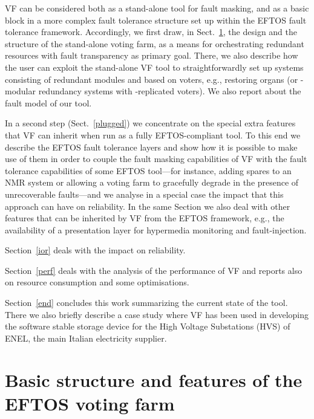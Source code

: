 \documentclass[11pt]{article}
\begin{document}
VF can be considered both as a stand-alone tool for fault masking, and
as a basic block in a more complex fault tolerance structure set up within
the EFTOS fault tolerance framework.  Accordingly, we first draw, in Sect.~\ref{standalone},
the design and the structure of the stand-alone voting farm, as a
means for orchestrating redundant resources with fault transparency as primary goal.
There, we also describe how the user can exploit the stand-alone VF tool to straightforwardly
set up systems consisting of redundant modules and based on voters, e.g.,
restoring organs (or -modular redundancy systems with -replicated voters).
We also report about the fault model of our tool.

In a second step (Sect.~\ref{plugged})
we concentrate on the special extra features that VF
can inherit when run as a fully EFTOS-compliant tool. To this end we 
describe the EFTOS fault tolerance layers and show how it is possible
to make use of them in order to couple the fault masking capabilities
of VF with the fault tolerance capabilities of some EFTOS tool---for instance,
adding spares to an NMR
system or allowing a voting farm to gracefully degrade in the presence
of unrecoverable faults---and we analyse in a special case the impact that
this approach can have on reliability. In the same Section we also deal with other
features that can be inherited by VF from the EFTOS framework, e.g.,
the availability of a presentation layer for hypermedia monitoring
and fault-injection.

Section~\ref{ior} deals with the impact on reliability.

Section~\ref{perf} deals with the analysis of the performance of VF
and reports also on resource consumption and some optimisations.

Section~\ref{end} concludes this work summarizing the current state of the tool. There we also
briefly describe a case study where
VF has been used in developing the software stable storage
device for the High Voltage Substations (HVS) of ENEL, the
main Italian electricity supplier.


\section{Basic structure and features of the EFTOS voting farm}\label{standalone}
\end{document}
